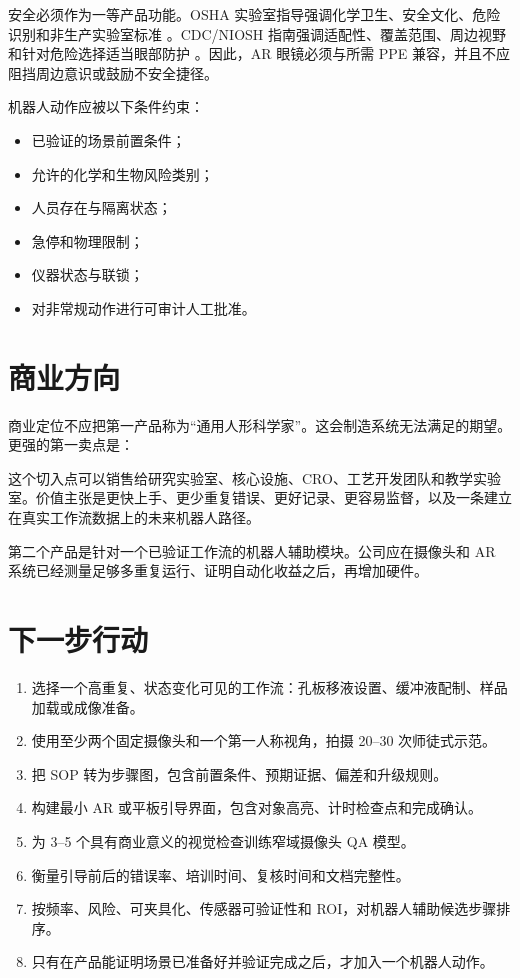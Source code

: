 \documentclass[11pt,fontset=none]{ctexart}
\begin{document}
安全必须作为一等产品功能。OSHA 实验室指导强调化学卫生、安全文化、危险识别和非生产实验室标准 \cite{oshaLabs}。CDC/NIOSH 指南强调适配性、覆盖范围、周边视野和针对危险选择适当眼部防护 \cite{nioshEye}。因此，AR 眼镜必须与所需 PPE 兼容，并且不应阻挡周边意识或鼓励不安全捷径。

机器人动作应被以下条件约束：

\begin{itemize}
  \item 已验证的场景前置条件；
  \item 允许的化学和生物风险类别；
  \item 人员存在与隔离状态；
  \item 急停和物理限制；
  \item 仪器状态与联锁；
  \item 对非常规动作进行可审计人工批准。
\end{itemize}

\section{商业方向}

商业定位不应把第一产品称为“通用人形科学家”。这会制造系统无法满足的期望。更强的第一卖点是：

\begin{center}
\end{center}

这个切入点可以销售给研究实验室、核心设施、CRO、工艺开发团队和教学实验室。价值主张是更快上手、更少重复错误、更好记录、更容易监督，以及一条建立在真实工作流数据上的未来机器人路径。

第二个产品是针对一个已验证工作流的机器人辅助模块。公司应在摄像头和 AR 系统已经测量足够多重复运行、证明自动化收益之后，再增加硬件。

\section{下一步行动}

\begin{enumerate}
  \item 选择一个高重复、状态变化可见的工作流：孔板移液设置、缓冲液配制、样品加载或成像准备。
  \item 使用至少两个固定摄像头和一个第一人称视角，拍摄 20--30 次师徒式示范。
  \item 把 SOP 转为步骤图，包含前置条件、预期证据、偏差和升级规则。
  \item 构建最小 AR 或平板引导界面，包含对象高亮、计时检查点和完成确认。
  \item 为 3--5 个具有商业意义的视觉检查训练窄域摄像头 QA 模型。
  \item 衡量引导前后的错误率、培训时间、复核时间和文档完整性。
  \item 按频率、风险、可夹具化、传感器可验证性和 ROI，对机器人辅助候选步骤排序。
  \item 只有在产品能证明场景已准备好并验证完成之后，才加入一个机器人动作。
\end{enumerate}
\end{document}
